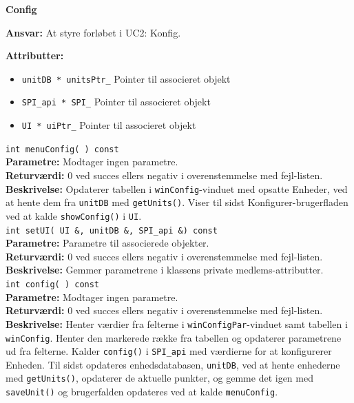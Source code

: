 {\centering
\textbf{Config}\par
}
\textbf{Ansvar:} At styre forløbet i UC2: Konfig. \

\textbf{Attributter:}
\begin{itemize}
	\item \verb+unitDB * unitsPtr_+ Pointer til associeret objekt
	\item \verb+SPI_api * SPI_+ Pointer til associeret objekt
	\item \verb+UI * uiPtr_+ Pointer til associeret objekt
\end{itemize}

\verb+int menuConfig( ) const+ \\
\textbf{Parametre:} Modtager ingen parametre. \\
\textbf{Returværdi:} 0 ved succes ellers negativ i overenstemmelse med fejl-listen. \\
\textbf{Beskrivelse:} Opdaterer tabellen i \verb+winConfig+-vinduet med opsatte Enheder, ved at hente dem fra \verb+unitDB+ med \verb+getUnits()+. Viser til sidst Konfigurer-brugerfladen ved at kalde \verb+showConfig()+ i \verb+UI+.\\

\verb+int setUI( UI &, unitDB &, SPI_api &) const+ \\
\textbf{Parametre:} Parametre til associerede objekter. \\
\textbf{Returværdi:} 0 ved succes ellers negativ i overenstemmelse med fejl-listen. \\
\textbf{Beskrivelse:} Gemmer parametrene i klassens private medlems-attributter. \\

\verb+int config( ) const+ \\
\textbf{Parametre:} Modtager ingen parametre. \\
\textbf{Returværdi:} 0 ved succes ellers negativ i overenstemmelse med fejl-listen. \\
\textbf{Beskrivelse:} Henter værdier fra felterne i \verb+winConfigPar+-vinduet samt tabellen i \verb+winConfig+. Henter den markerede række fra tabellen og opdaterer parametrene ud fra felterne. Kalder \verb+config()+ i \verb+SPI_api+ med værdierne for at konfigurerer Enheden. Til sidst opdateres enhedsdatabasen, \verb+unitDB+, ved at hente enhederne med \verb+getUnits()+, opdaterer de aktuelle punkter, og gemme det igen med \verb+saveUnit()+ og brugerfalden opdateres ved at kalde \verb+menuConfig+. \\

